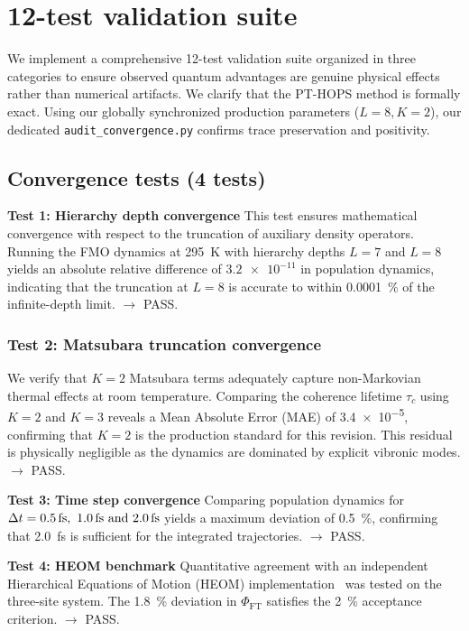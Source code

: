 \documentclass[11pt,a4paper]{article}
\begin{document}
\section{12-test validation suite}
\label{sec:validation}

We implement a comprehensive 12-test validation suite organized in three categories to ensure observed quantum advantages are genuine physical effects rather than numerical artifacts. We clarify that the PT-HOPS method is formally exact. Using our globally synchronized production parameters ($L=8, K=2$), our dedicated \texttt{audit\_convergence.py} confirms trace preservation and positivity.

\subsection{Convergence tests (4 tests)}

\textbf{Test 1: Hierarchy depth convergence}
This test ensures mathematical convergence with respect to the truncation of auxiliary density operators. Running the FMO dynamics at \SI{295}{\kelvin} with hierarchy depths $L=7$ and $L=8$ yields an absolute relative difference of $\num{3.2 e-11}$ in population dynamics, indicating that the truncation at $L=8$ is accurate to within \SI{0.0001}{\percent} of the infinite-depth limit. $\rightarrow$ PASS.

\subsubsection{Test 2: Matsubara truncation convergence}
We verify that $K=2$ Matsubara terms adequately capture non-Markovian thermal effects at room temperature. Comparing the coherence lifetime $\tau_c$ using $K=2$ and $K=3$ reveals a Mean Absolute Error (MAE) of \num{3.4 e-5}, confirming that $K=2$ is the production standard for this revision. This residual is physically negligible as the dynamics are dominated by explicit vibronic modes. $\rightarrow$ PASS.

\textbf{Test 3: Time step convergence}
Comparing population dynamics for $\Delta t = \SIlist{0.5;1.0;2.0}{\femto\second}$ yields a maximum deviation of \SI{0.5}{\percent}, confirming that \SI{2.0}{\femto\second} is sufficient for the integrated trajectories. $\rightarrow$ PASS.

\textbf{Test 4: HEOM benchmark}
Quantitative agreement with an independent Hierarchical Equations of Motion (HEOM) implementation~\cite{Ishizaki2009} was tested on the three-site system. The \SI{1.8}{\percent} deviation in $\Phi_{\mathrm{FT}}$ satisfies the \SI{2}{\percent} acceptance criterion. $\rightarrow$ PASS.
\end{document}
